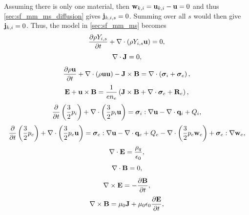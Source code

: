 \documentclass[a4paper,11pt]{report}
\begin{document}
Assuming there is only one material, then $\mathbf{w}_{k,i} = \mathbf{u}_{k,i} - \mathbf{u} = 0$ and thus \cref{sec:sf_mm_ms_diffusion} gives $\mathbf{j}_{k,i,s} = 0$.  Summing over all $s$ would then give $\mathbf{j}_{k,i} = 0$. Thus, the model in \cref{sec:sf_mm_ms} becomes
\begin{equation}
    \label{eq:sf_sm_ms_ni}
    \frac{\partial \rho Y_{i,s}}{\partial t} + \nabla \cdot \left( \rho Y_{i,s} \mathbf{u} \right) = 0,
\end{equation}
\begin{equation}
    \label{eq:sf_sm_ms_ne}
    \nabla \cdot \mathbf{J} = 0,
\end{equation}
\begin{equation}
    \label{eq:sf_sm_ms_ui}
    \frac{\partial \rho \mathbf{u}}{\partial t} + \nabla \cdot \left( \rho \mathbf{u} \mathbf{u} \right) - \mathbf{J} \times \mathbf{B} = \nabla \cdot \left( \bm \sigma_i + \bm \sigma_e \right),
\end{equation}
\begin{equation}
    \label{eq:sf_sm_ms_ue}
    \mathbf{E} + \mathbf{u} \times \mathbf{B} = \frac{1}{e n_e} \left( \mathbf{J} \times \mathbf{B} + \nabla \cdot \bm \sigma_e + \mathbf{R}_e \right),
\end{equation}
\begin{equation}
    \label{eq:sf_sm_ms_iei}
    \frac{\partial}{\partial t} \left( \frac{3}{2} p_i \right) + \nabla \cdot \left( \frac{3}{2} p_i \mathbf{u} \right) = \bm \sigma_i : \nabla \mathbf{u} - \nabla \cdot \mathbf{q}_i + Q_i,
\end{equation}
\begin{equation}
    \label{eq:sf_sm_ms_iee}
    \frac{\partial}{\partial t} \left( \frac{3}{2} p_e \right) + \nabla \cdot \left( \frac{3}{2} p_e \mathbf{u} \right) = \bm \sigma_e : \nabla \mathbf{u} - \nabla \cdot \mathbf{q}_e + Q_e - \nabla \cdot \left( \frac{3}{2} p_e \mathbf{w}_e \right) + \bm \sigma_e : \nabla \mathbf{w}_e,
\end{equation}
\begin{equation}
    \label{eq:sf_sm_ms_maxwell_3}
    \nabla \cdot \mathbf{E} = \frac{\rho_q}{\epsilon_0},
\end{equation}
\begin{equation}
    \label{eq:sf_sm_ms_maxwell_4}
    \nabla \cdot \mathbf{B} = 0,
\end{equation}
\begin{equation}
    \label{eq:sf_sm_ms_maxwell_1}
    \nabla \times \mathbf{E} = -\frac{ \partial \mathbf{B}}{\partial t},
\end{equation}
\begin{equation}
    \label{eq:sf_sm_ms_maxwell_2}
    \nabla \times \mathbf{B} = \mu_0 \mathbf{J} + \mu_0 \epsilon_0 \frac{\partial \mathbf{E}}{\partial t},
\end{equation}
\end{document}
